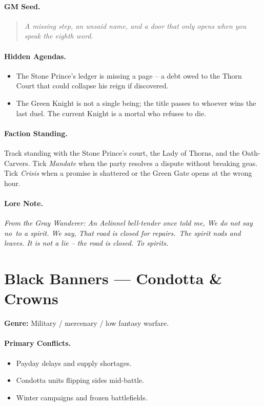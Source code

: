 \paragraph{GM Seed.}
\begin{quote}
\emph{A missing step, an unsaid name, and a door that only opens when you speak the eighth word.}
\end{quote}

\paragraph{Hidden Agendas.}
\begin{itemize}
  \item The Stone Prince's ledger is missing a page -- a debt owed to the Thorn Court that could collapse his reign if discovered.
  \item The Green Knight is not a single being; the title passes to whoever wins the last duel. The current Knight is a mortal who refuses to die.
\end{itemize}

\paragraph{Faction Standing.}
Track standing with the Stone Prince's court, the Lady of Thorns, and the Oath-Carvers. Tick \textit{Mandate} when the party resolves a dispute without breaking geas. Tick \textit{Crisis} when a promise is shattered or the Green Gate opens at the wrong hour.

\paragraph{Lore Note.}
\emph{From the Gray Wanderer: \textquotedbl An Aelinnel bell-tender once told me, \textquotedbl We do not say \textquotedbl no\textquotedbl\ to a spirit. We say, \textquotedbl That road is closed for repairs.\textquotedbl\ The spirit nods and leaves. It is not a lie -- the road is closed. To spirits.\textquotedbl}

\section{Black Banners --- \textquotedbl Condotta \& Crowns\textquotedbl}
\textbf{Genre:} Military / mercenary / low fantasy warfare.

\paragraph{Primary Conflicts.}
\begin{itemize}
  \item Payday delays and supply shortages.
  \item Condotta units flipping sides mid-battle.
  \item Winter campaigns and frozen battlefields.
\end{itemize}

